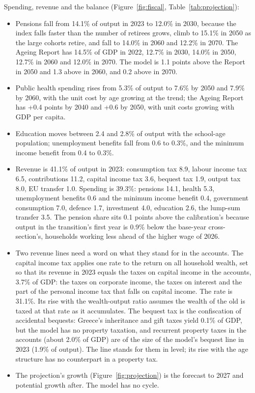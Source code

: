 \documentclass[11pt,a4paper]{article}
\begin{document}
\noindent Spending, revenue and the balance (Figure~\ref{fig:fiscal}, Table~\ref{tab:projection}):
\begin{itemize}
\item Pensions fall from 14.1\% of output in 2023 to 12.0\% in 2030, because
  the index falls faster than the number of retirees grows, climb to 15.1\%
  in 2050 as the large cohorts retire, and fall to 14.0\% in 2060 and 12.2\%
  in 2070. The Ageing Report has 14.5\% of GDP in 2022, 12.7\% in 2030,
  14.0\% in 2050, 12.7\% in 2060 and 12.0\% in 2070. The model is 1.1 points
  above the Report in 2050 and 1.3 above in 2060, and 0.2 above in 2070.
\item Public health spending rises from 5.3\% of output to 7.6\% by 2050
  and 7.9\% by 2060, with the unit cost by age growing at the trend; the
  Ageing Report has +0.4 points by 2040 and +0.6 by 2050, with unit costs
  growing with GDP per capita.
\item Education moves between 2.4 and 2.8\% of output with the school-age
  population; unemployment benefits fall from 0.6 to 0.3\%, and the
  minimum income benefit from 0.4 to 0.3\%.
\item Revenue is 41.1\% of output in 2023: consumption tax 8.9, labour
  income tax 6.5, contributions 11.2, capital income tax 3.6, bequest tax
  1.9, output tax 8.0, EU transfer 1.0. Spending is 39.3\%: pensions 14.1,
  health 5.3, unemployment benefits 0.6 and the minimum income benefit 0.4,
  government consumption 7.0, defence 1.7, investment 4.0, education 2.6,
  the lump-sum transfer 3.5. The pension share sits 0.1 points above the
  calibration's because output in the transition's first year is 0.9\%
  below the base-year cross-section's, households working less ahead of
  the higher wage of 2026.
\item Two revenue lines need a word on what they stand for in the accounts.
  The capital income tax applies one rate to the return on all household
  wealth, set so that its revenue in 2023 equals the taxes on capital
  income in the accounts, 3.7\% of GDP: the taxes on corporate income, the
  taxes on interest and the part of the personal income tax that falls on
  capital income. The rate is 31.1\%. Its rise with the wealth-output ratio assumes the wealth
  of the old is taxed at that rate as it accumulates. The bequest tax is the
  confiscation of accidental bequests: Greece's inheritance and gift taxes
  yield 0.1\% of GDP, but the model has no property taxation, and recurrent
  property taxes in the accounts (about 2.0\% of GDP) are of the size of
  the model's bequest line in 2023 (1.9\% of output). The line stands for them in level; its
  rise with the age structure has no counterpart in a property tax.
\item The projection's growth (Figure~\ref{fig:projection}) is the forecast
  to 2027 and potential growth after. The model has no cycle.
\end{itemize}
\end{document}
